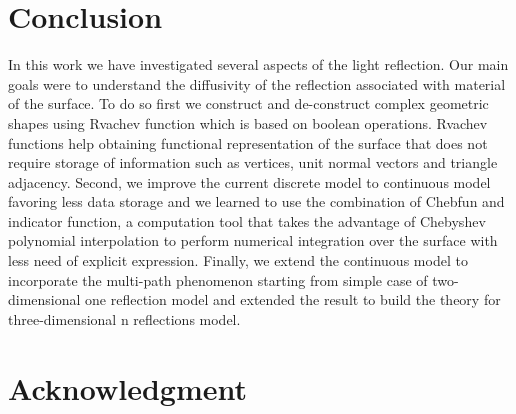 \documentclass[11pt]{amsart}
\theoremstyle{definition}
\begin{document}
\section{Conclusion}

In this work we have investigated several aspects of the light reflection. Our main goals were to understand the diffusivity of the reflection associated with material of the surface. To do so first we construct and de-construct complex geometric shapes using Rvachev function which is based on boolean operations. Rvachev functions help obtaining functional representation of the surface that does not require storage of information such as vertices, unit normal vectors and triangle adjacency.
Second, we improve the current discrete model to continuous model favoring less data storage and we learned to use the combination of Chebfun and indicator function, a computation tool that takes the advantage of Chebyshev polynomial interpolation to perform numerical integration over the surface with less need of explicit expression.
Finally, we extend the continuous model to incorporate the multi-path phenomenon starting from simple case of two-dimensional one reflection model and extended the result to build the theory for three-dimensional n reflections model.

\section{Acknowledgment}
\end{document}
